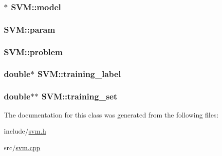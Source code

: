 \subsubsection[{model}]{$\ast$ S\+V\+M\+::model}\hypertarget{classSVM_a546f3dfe2004cbf9096105a67b0a0e66}{}\label{classSVM_a546f3dfe2004cbf9096105a67b0a0e66}
\subsubsection[{param}]{ S\+V\+M\+::param}\hypertarget{classSVM_ad28af66070f8e9f9f6c74132c78aa245}{}\label{classSVM_ad28af66070f8e9f9f6c74132c78aa245}
\subsubsection[{problem}]{ S\+V\+M\+::problem}\hypertarget{classSVM_a154369e018e4f487838709b350474bc6}{}\label{classSVM_a154369e018e4f487838709b350474bc6}
\subsubsection[{training\+\_\+label}]{\setlength{\rightskip}{0pt plus 5cm}double$\ast$ S\+V\+M\+::training\+\_\+label}\hypertarget{classSVM_a4a2cfc7a3b8b1e65a8edd81ffc0985ba}{}\label{classSVM_a4a2cfc7a3b8b1e65a8edd81ffc0985ba}
\subsubsection[{training\+\_\+set}]{\setlength{\rightskip}{0pt plus 5cm}double$\ast$$\ast$ S\+V\+M\+::training\+\_\+set}\hypertarget{classSVM_a0d63a10c574ace471efcd8e6553b7bd9}{}\label{classSVM_a0d63a10c574ace471efcd8e6553b7bd9}


The documentation for this class was generated from the following files\+:\begin{DoxyCompactItemize}
\item 
include/\hyperlink{svm_8h}{svm.\+h}\item 
src/\hyperlink{svm_8cpp}{svm.\+cpp}\end{DoxyCompactItemize}
